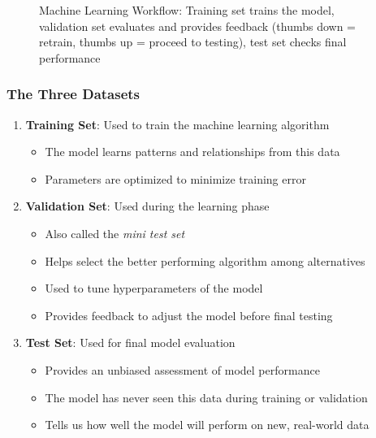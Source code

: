 \documentclass[11pt,a4paper]{article}
\theoremstyle{definition}
\theoremstyle{plain}
\theoremstyle{remark}
\begin{document}
\begin{figure}[h]
\caption{Machine Learning Workflow: Training set trains the model, validation set evaluates and provides feedback (thumbs down = retrain, thumbs up = proceed to testing), test set checks final performance}
\end{figure}

\subsubsection{The Three Datasets}

\begin{enumerate}
    \item \textbf{Training Set}: Used to train the machine learning algorithm
    \begin{itemize}
        \item The model learns patterns and relationships from this data
        \item Parameters are optimized to minimize training error
    \end{itemize}
    
    \item \textbf{Validation Set}: Used during the learning phase
    \begin{itemize}
        \item Also called the \textit{mini test set}
        \item Helps select the better performing algorithm among alternatives
        \item Used to tune hyperparameters of the model
        \item Provides feedback to adjust the model before final testing
    \end{itemize}
    
    \item \textbf{Test Set}: Used for final model evaluation
    \begin{itemize}
        \item Provides an unbiased assessment of model performance
        \item The model has never seen this data during training or validation
        \item Tells us how well the model will perform on new, real-world data
    \end{itemize}
\end{enumerate}
\end{document}
